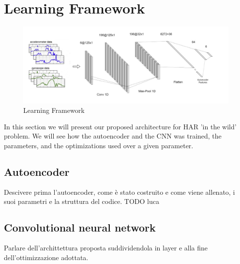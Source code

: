 \section{Learning Framework}
\label{sec:learning_framework}

\begin{figure}[h]
	\centering
	\includegraphics[width=1\textwidth]{images/full_architecture.jpg}
	\caption{Learning Framework}
	\label{fig:proposed-architecture}
\end{figure}

In this section we will present our proposed architecture for HAR 'in the wild' problem. We will see how the autoencoder and the CNN was trained, the parameters, and the optimizations used over a given parameter.

\subsection{Autoencoder}

Descivere prima l'autoencoder, come è stato costruito e come viene allenato, i suoi parametri e la struttura del codice. TODO luca

\subsection{Convolutional neural network}
Parlare dell'archittettura proposta suddividendola in layer e alla fine dell'ottimizzazione adottata.

